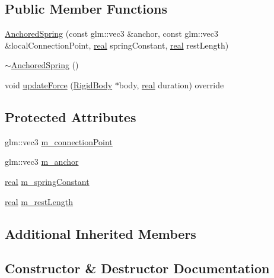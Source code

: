 \subsection*{Public Member Functions}
\begin{DoxyCompactItemize}
\item 
\mbox{\hyperlink{classrum_1_1_anchored_spring_a3bce11c4c0009f1ae3da23525cb99d6c}{Anchored\+Spring}} (const glm\+::vec3 \&anchor, const glm\+::vec3 \&local\+Connection\+Point, \mbox{\hyperlink{namespacerum_a7e8cca23573d5eaead0f138cbaa4862c}{real}} spring\+Constant, \mbox{\hyperlink{namespacerum_a7e8cca23573d5eaead0f138cbaa4862c}{real}} rest\+Length)
\item 
\mbox{\hyperlink{classrum_1_1_anchored_spring_a674ab5042f8a16e50f6635b2b7737b86}{$\sim$\+Anchored\+Spring}} ()
\item 
void \mbox{\hyperlink{classrum_1_1_anchored_spring_aeb146ac725ea6f9ee9c52b322ba70452}{update\+Force}} (\mbox{\hyperlink{classrum_1_1_rigid_body}{Rigid\+Body}} $\ast$body, \mbox{\hyperlink{namespacerum_a7e8cca23573d5eaead0f138cbaa4862c}{real}} duration) override
\end{DoxyCompactItemize}
\subsection*{Protected Attributes}
\begin{DoxyCompactItemize}
\item 
glm\+::vec3 \mbox{\hyperlink{classrum_1_1_anchored_spring_ab828f6a46832b1a36909bf858608579b}{m\+\_\+connection\+Point}}
\item 
glm\+::vec3 \mbox{\hyperlink{classrum_1_1_anchored_spring_ae13ff4ceb813a9e88182fdf04d890d08}{m\+\_\+anchor}}
\item 
\mbox{\hyperlink{namespacerum_a7e8cca23573d5eaead0f138cbaa4862c}{real}} \mbox{\hyperlink{classrum_1_1_anchored_spring_a9ceccbbc91b17c65825827b595d242d2}{m\+\_\+spring\+Constant}}
\item 
\mbox{\hyperlink{namespacerum_a7e8cca23573d5eaead0f138cbaa4862c}{real}} \mbox{\hyperlink{classrum_1_1_anchored_spring_a399861e72ff803834a5203f79741653c}{m\+\_\+rest\+Length}}
\end{DoxyCompactItemize}
\subsection*{Additional Inherited Members}


\subsection{Constructor \& Destructor Documentation}
\mbox{\label{classrum_1_1_anchored_spring_a3bce11c4c0009f1ae3da23525cb99d6c}} 
